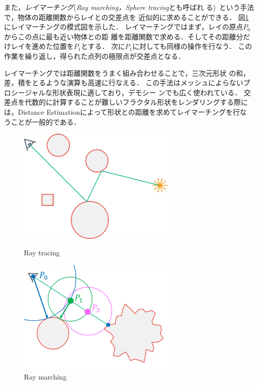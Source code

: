 また，\emph{レイマーチング}({\it Ray marching，Sphere tracing}とも呼ばれ
る)~\cite{hart1996sphere}という手法で，物体の距離関数からレイとの交差点を
近似的に求めることができる．
図\ref{fig:raymarch}にレイマーチングの模式図を示した．
レイマーチングではまず，レイの原点$P_0$からこの点に最も近い物体との距
離を距離関数で求める．そしてその距離分だけレイを進めた位置を$P_1$とする．
次に$P_1$に対しても同様の操作を行なう．
この作業を繰り返し，得られた点列の極限点が交差点となる．

レイマーチングでは距離関数をうまく組み合わせることで，三次元形状
の和，差，積をとるような演算も高速に行なえる．
この手法はメッシュによらないプロシージャルな形状表現に適しており，デモシー
ンでも広く使われている．
交差点を代数的に計算することが難しいフラクタル形状をレンダリングする際に
は，Distance Estimationによって形状との距離を求めてレイマーチングを行な
うことが一般的である．

 \begin{figure}[htbp]
  \begin{minipage}{0.5\hsize}
   \center
   \includegraphics[width=3in, keepaspectratio]{../img/fractal/raytrace.pdf}
   \caption{Ray tracing}
   \label{fig:raytrace}
  \end{minipage}
  \begin{minipage}{0.5\hsize}
   \center
   \includegraphics[width=3in, keepaspectratio]{../img/fractal/raymarching.pdf}
   \caption{Ray marching}
   \label{fig:raymarch}
  \end{minipage}
 \end{figure}

